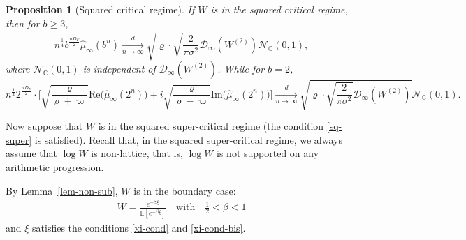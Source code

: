 \documentclass[12pt]{amsart}
\newtheorem{proposition}[theorem]{Proposition}
\theoremstyle{definition}
\theoremstyle{remark}
\newcommand{\C}{\mathbb{C}}
\newcommand{\E}{\mathbb{E}}
\numberwithin{equation}{section}
\begin{document}
\begin{proposition}[Squared critical regime]\label{thm-sq-critical}
If $W$  is in the squared critical regime, 
 then for $b \ge 3$, 
$$
n^{\frac{1}{4}} b^{\frac{n D_F}{2}} \widehat{\mu}_{\infty}(b^n)\xrightarrow[n\to\infty]{d} \sqrt{\varrho\cdot \sqrt{\frac{2}{\pi \sigma^2}}\mathscr{D}_\infty(W^{(2)})}\mathcal{N}_\C(0,1),
$$
where  $\mathcal{N}_\C(0,1)$ is independent of $\mathscr{D}_\infty(W^{(2)})$. While for $b=2$,
\[ 
n^{\frac{1}{4}} 2^{\frac{nD_F}{2}}  \cdot  \Big[   \sqrt{ \frac{\varrho}{\varrho+\varpi}} \mathrm{Re} \big(\widehat{\mu}_{\infty}(2^n)\big) + i  \sqrt{ \frac{\varrho}{\varrho-\varpi}} \mathrm{Im} \big(\widehat{\mu}_{\infty}(2^n)\big) \Big]   \xrightarrow[n\to\infty]{d}  \sqrt{\varrho\cdot \sqrt{\frac{2}{\pi \sigma^2}}\mathscr{D}_\infty(W^{(2)})}\mathcal{N}_\C(0,1).
\]
 \end{proposition}





 
 
 
 Now suppose that $W$ is in the squared super-critical regime (the condition \eqref{sq-super} is satisfied).   Recall that, in the squared super-critical regime, we always assume that   $\log W$ is non-lattice, that is, $\log W$ is not supported on any arithmetic progression.
 
 
By Lemma~\ref{lem-non-sub},  $W$ is in the boundary case: 
\begin{align}\label{bdd-case}
W= \frac{e^{-\beta \xi}}{\E[e^{-\beta \xi}]}   \quad  \text{with} \quad    \frac{1}{2} < \beta< 1
\end{align}
and $\xi$ satisfies the conditions \eqref{xi-cond} and \eqref{xi-cond-bis}. 
\end{document}
